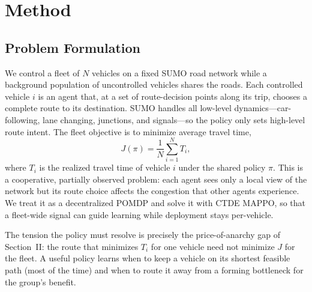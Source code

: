 \section{Method}

\subsection{Problem Formulation}
We control a fleet of $N$ vehicles on a fixed SUMO road network while a background
population of uncontrolled vehicles shares the roads. Each controlled vehicle $i$ is an
agent that, at a set of route-decision points along its trip, chooses a complete route to
its destination. SUMO handles all low-level dynamics---car-following, lane changing,
junctions, and signals---so the policy only sets high-level route intent. The fleet
objective is to minimize average travel time,
\begin{equation}
  J(\pi) = \frac{1}{N}\sum_{i=1}^{N} T_i,
\end{equation}
where $T_i$ is the realized travel time of vehicle $i$ under the shared policy $\pi$.
This is a cooperative, partially observed problem: each agent sees only a local view of
the network but its route choice affects the congestion that other agents experience.
We treat it as a decentralized POMDP and solve it with CTDE MAPPO, so that a fleet-wide
signal can guide learning while deployment stays per-vehicle.

The tension the policy must resolve is precisely the price-of-anarchy gap of
Section~II: the route that minimizes $T_i$ for one vehicle need not minimize $J$ for the
fleet. A useful policy learns when to keep a vehicle on its shortest feasible path
(most of the time) and when to route it away from a forming bottleneck for the group's
benefit.

